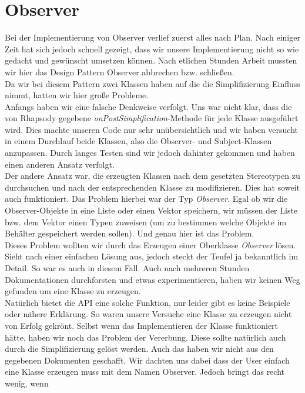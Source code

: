 \section{Observer}
Bei der Implementierung von Observer verlief zuerst alles nach Plan. Nach
einiger Zeit hat sich jedoch schnell gezeigt, dass wir unsere Implementierung
nicht so wie gedacht und gewünscht umsetzen können. Nach etlichen Stunden Arbeit mussten wir
hier das Design Pattern Observer abbrechen bzw. schließen.\\
Da wir bei diesem Pattern zwei Klassen haben auf die die Simplifizierung
Einfluss nimmt, hatten wir hier große Probleme.\\
Anfangs haben wir eine falsche Denkweise verfolgt. Uns war nicht klar, dass die
von Rhapsody gegebene \textit{onPostSimplification}-Methode für jede Klasse ausgeführt
wird.
Dies machte unseren Code nur sehr unübersichtlich und wir haben versucht in einem Durchlauf
beide Klassen, also die Observer- und Subject-Klassen
anzupassen. Durch langes Testen sind wir jedoch dahinter gekommen und haben
einen anderen Ansatz verfolgt.\\
Der andere Ansatz war, die erzeugten Klassen nach dem
gesetzten Stereotypen zu durchsuchen und nach der entsprechenden Klasse zu modifizieren.
Dies hat soweit auch funktioniert. Das Problem hierbei war der Typ \textit{Observer}. Egal ob
wir die Observer-Objekte in eine Liste oder einen Vektor speichern, wir müssen der 
Liste bzw. dem Vektor einen Typen zuweisen (um zu bestimmen welche Objekte im Behälter
gespeichert werden sollen). Und genau hier ist das Problem.\\
Dieses Problem wollten wir durch das Erzeugen einer Oberklasse \textit{Observer} lösen.
Sieht nach einer einfachen Lösung aus, jedoch steckt der Teufel ja bekanntlich
im Detail. So war es auch in diesem Fall. Auch nach mehreren Stunden
Dokumentationen durchforsten und etwas experimentieren, haben wir keinen Weg
gefunden um eine Klasse zu erzeugen.\\
Natürlich bietet die API eine solche Funktion, nur leider gibt es keine Beispiele
oder nähere Erklärung. So waren unsere Versuche eine Klasse zu erzeugen nicht
von Erfolg gekrönt. Selbst wenn das Implementieren der Klasse funktioniert
hätte, haben wir noch das Problem der Vererbung. Diese sollte natürlich auch
durch die Simplifizierung gelöst werden. Auch das haben wir nicht aus den
gegebenen Dokumenten geschafft. Wir dachten uns dabei dass der User einfach eine
Klasse erzeugen muss mit dem Namen Observer. Jedoch bringt das recht wenig, wenn
